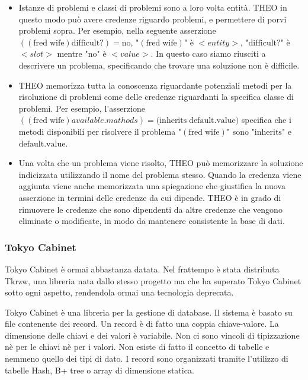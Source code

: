 \begin{itemize}
\begin{itemize}
\end{itemize}
\item Istanze di problemi e classi di problemi sono a loro volta entità. THEO in questo modo può avere credenze riguardo problemi, e permettere di porvi problemi sopra. Per esempio, nella seguente asserzione  $((\textrm{fred}\; \textrm{wife}) \textrm{difficult?}) = \textrm{no}$, "$(\textrm{fred}\; \textrm{wife})$" è $<entity>$, "$\textrm{difficult?}$" è $<slot>$ mentre "$\textrm{no}$" è $<value>$. In questo caso siamo riusciti a descrivere un problema, specificando che trovare una soluzione non è difficile.
\item THEO memorizza tutta la conoscenza riguardante potenziali metodi per la risoluzione di problemi come delle credenze riguardanti la specifica classe di problemi. Per esempio, l'asserzione $((\textrm{fred}\;\textrm{wife}) available.mathods) = (\textrm{inherits}\;\textrm{default.value)}$ specifica che i metodi disponibili per risolvere il problema "$(\textrm{fred}\; \textrm{wife})$" sono "$\textrm{inherits}$" e $\textrm{default.value}$.
\item Una volta che un problema viene risolto, THEO può memorizzare la soluzione indicizzata utilizzando il nome del problema stesso. Quando la credenza viene aggiunta viene anche memorizzata una spiegazione che giustifica la nuova asserzione in termini delle credenze da cui dipende. THEO è in grado di rimuovere le credenze che sono dipendenti da altre credenze che vengono eliminate o modificate, in modo da mantenere consistente la base di dati\cite{theofram80:online}.
\end{itemize}
\subsubsection{Tokyo Cabinet}

\begin{warn}
	Tokyo Cabinet è ormai abbastanza datata. Nel frattempo è stata distributa Tkrzw, una libreria nata dallo stesso progetto ma che ha superato Tokyo Cabinet sotto ogni aspetto, rendendola ormai una tecnologia deprecata.
\end{warn}

\noindent Tokyo Cabinet è una libreria per la gestione di database. Il sistema è basato su file contenente dei record. Un record è di fatto una coppia chiave-valore. La dimensione delle chiavi e dei valori è variabile. Non ci sono vincoli di tipizzazione nè per le chiavi nè per i valori. Non esiste di fatto il concetto di tabelle e nemmeno quello dei tipi di dato. I record sono organizzati tramite l'utilizzo di tabelle Hash, B+ tree o array di dimensione statica.

